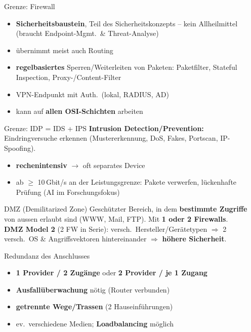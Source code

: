 \documentclass[a4paper, fontsize=7pt]{scrartcl}
\begin{document}
\begin{mainbox}{Grenze: Firewall}
\begin{itemize}
    \item \textbf{Sicherheitsbaustein}, Teil des Sicherheitskonzepts --
          kein Allheilmittel (braucht Endpoint-Mgmt.\ \& Threat-Analyse)
    \item übernimmt meist auch Routing
    \item \textbf{regelbasiertes} Sperren/Weiterleiten von Paketen:
          Paketfilter, Stateful Inspection, Proxy-/Content-Filter
    \item VPN-Endpunkt mit Auth.\ (lokal, RADIUS, AD)
    \item kann auf \textbf{allen OSI-Schichten} arbeiten
\end{itemize}
\end{mainbox}

\begin{mainbox}{Grenze: IDP = IDS + IPS}
\textbf{Intrusion Detection/Prevention:} Eindringversuche erkennen
(Mustererkennung, DoS, Fakes, Portscan, IP-Spoofing).
\begin{itemize}
    \item \textbf{rechenintensiv} $\to$ oft separates Device
    \item ab $\geq$ 10\,Gbit/s an der Leistungsgrenze: Pakete verwerfen,
          lückenhafte Prüfung (AI im Forschungsfokus)
\end{itemize}
\end{mainbox}

\begin{mainbox}{DMZ (Demilitarized Zone)}
Geschützter Bereich, in dem \textbf{bestimmte Zugriffe} von aussen erlaubt
sind (WWW, Mail, FTP). Mit \textbf{1 oder 2 Firewalls}.\\
\textbf{DMZ Model 2} (2 FW in Serie): versch.\ Hersteller/Gerätetypen
$\Rightarrow$ 2 versch.\ OS \& Angriffsvektoren hintereinander
$\Rightarrow$ \textbf{höhere Sicherheit}.
\end{mainbox}

\begin{mainbox}{Redundanz des Anschlusses}
\begin{itemize}
    \item \textbf{1 Provider / 2 Zugänge} oder \textbf{2 Provider / je 1
          Zugang}
    \item \textbf{Ausfallüberwachung} nötig (Router verbunden)
    \item \textbf{getrennte Wege/Trassen} (2 Hauseinführungen)
    \item ev.\ verschiedene Medien; \textbf{Loadbalancing} möglich
\end{itemize}
\end{mainbox}
\end{document}
